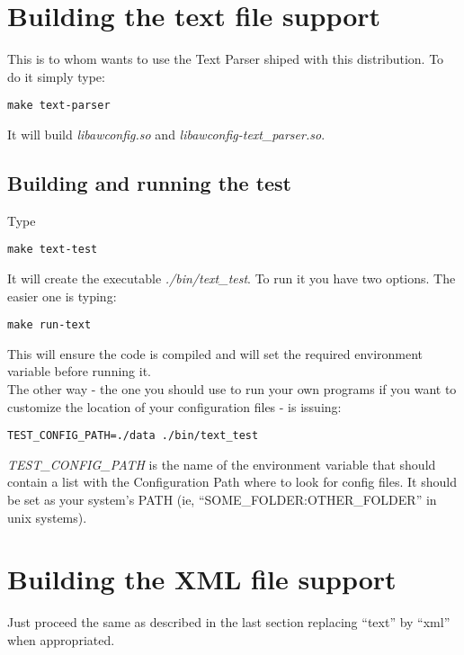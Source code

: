 \documentclass[a4paper]{book}
\begin{document}
\section{Building the text file support}
\label{sec:building:text_parser}

	This is to whom wants to use the Text Parser shiped with this distribution. To do it simply type:

	\begin{verbatim}
make text-parser
\end{verbatim}

	It will build \emph{libawconfig.so} and \emph{libawconfig-text\_parser.so}.

\subsection{Building and running the test}
\label{sec:building:text_parser:test}


	Type
	\begin{verbatim}
make text-test
\end{verbatim}

	It will create the executable \emph{./bin/text\_test}. To run it you have two options. The easier one is typing:
	\begin{verbatim}
make run-text
\end{verbatim}

	This will ensure the code is compiled and will set the required environment variable before running it.\\

	The other way - the one you should use to run your own programs if you want to customize the location of your configuration files - is issuing:
	\begin{verbatim}
TEST_CONFIG_PATH=./data ./bin/text_test
\end{verbatim}


	\emph{TEST\_CONFIG\_PATH} is the name of the environment variable that should contain a list with the Configuration Path where to look for config files. It should be set as your system's PATH (ie, ``SOME\_FOLDER:OTHER\_FOLDER'' in unix systems).

\section{Building the XML file support}
\label{sec:building:xml_parser}

	Just proceed the same as described in the last section replacing ``text'' by ``xml'' when appropriated.
\end{document}
